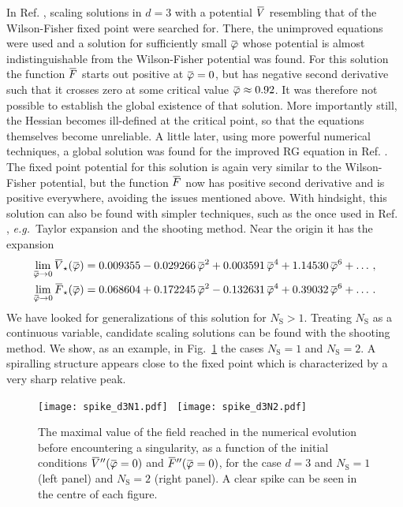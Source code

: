 \documentclass[11pt]{book} %
\newcommand{\overbar}[1]{\mkern 1.5mu\overline{\mkern-1.5mu#1\mkern-1.5mu}\mkern 1.5mu}
\newcommand\NS{ N_{\scriptscriptstyle{\mathrm{S}}} }
\newcommand{\bV}{\overbar V}
\newcommand{\bF}{\overbar F}
\newcommand{\bVstar}{\bV_\star}
\newcommand{\bFstar}{\bF_\star}
\newcommand{\bp}{\overbar \varphi}
\newcommand\eg{\textit{e.g.}\ }
\numberwithin{equation}{chapter}
\begin{document}
In Ref. \cite{Percacci:2015wwa}, scaling solutions in $d=3$
with a potential $\bV$ resembling that of the Wilson-Fisher fixed point
were searched for.
There, the unimproved equations were used
and a solution for sufficiently small $\bp$
whose potential is almost indistinguishable from the
Wilson-Fisher potential was found. For this solution the function $\bF$
starts out positive at $\bp = 0$, but has negative
second derivative such that it crosses zero at
some critical value $\bp \approx 0.92$.
It was therefore not possible to establish the global existence of that solution.
More importantly still, the Hessian becomes ill-defined at the
critical point, so that the equations themselves become unreliable.
A little later, using more powerful numerical techniques,
a global solution was found for the improved RG equation in Ref. \cite{Borchardt:2015rxa}.
The fixed point potential for this solution is again
very similar to the Wilson-Fisher potential,
but the function $\bF$ now has positive second derivative
and is positive everywhere, avoiding the issues mentioned above.
With hindsight, this solution can also be found with
simpler techniques, such as the once used in Ref. \cite{Percacci:2015wwa},
\eg Taylor expansion and the shooting method.
Near the origin it has the expansion
\begin{align}
  \lim_{\bp \rightarrow 0} \bVstar(\bp) &= 0.009355 - 0.029266 \, \bp ^2 + 0.003591 \, \bp ^4 + 1.14530 \, \bp ^6 + \dots \,, \\
  \lim_{\bp \rightarrow 0} \bFstar(\bp) &= 0.068604 + 0.172245 \, \bp ^2 - 0.132631 \, \bp ^4 + 0.39032 \, \bp ^6 + \dots \,.
\end{align}
We have looked for generalizations of this solution for $\NS>1$.
Treating $\NS$ as a continuous variable, candidate scaling solutions
can be found with the shooting method.
We show, as an example, in Fig.~\ref{WFN1N2} the cases $\NS=1$ and $\NS=2$.
A spiralling structure appears close to the fixed point which is characterized by a very sharp relative peak.
\begin{figure}
  \texttt{[image: spike\_d3N1.pdf]}
  \
  \texttt{[image: spike\_d3N2.pdf]}
  \caption{
    The maximal value of the field reached in the numerical
    evolution before encountering a singularity, as a function
    of the initial conditions $\bV''(\bp=0)$ and $\bF''(\bp=0)$,
    for the case $d=3$ and $\NS=1$ (left panel) and $\NS=2$ (right panel).
    A clear spike can be seen in the centre of each figure.
  }
  \label{WFN1N2}
\end{figure}
\end{document}
